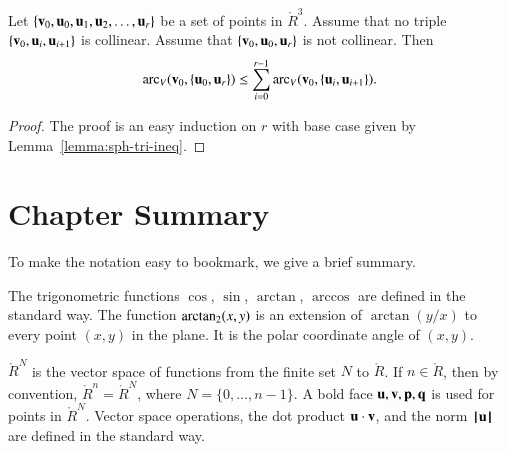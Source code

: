 \begin{lemma}[]
\label{lemma:sph-tri-multi}
Let $\{{\mathbf v}_0,{\mathbf u}_0,{\mathbf u}_1,{\mathbf u}_2,\ldots,{\mathbf u}_r\}$ be a set of points in
$\ring{R}^3$.  Assume that no triple $\{{\mathbf v}_0,{\mathbf u}_i,{\mathbf u}_{i+1}\}$ is
collinear.  Assume that $\{{\mathbf v}_0,{\mathbf u}_0,{\mathbf u}_r\}$ is not collinear.  Then
\[ 
  \operatorname{arc}_V({\mathbf v}_0,\{{\mathbf u}_0,{\mathbf u}_r\}) \le \sum_{i=0}^{r-1} \operatorname{arc}_V({\mathbf v}_0,\{{\mathbf u}_i,{\mathbf u}_{i+1}\}).
\] 
\end{lemma}

\begin{proof} The proof is an easy induction on $r$ with base case given by
  Lemma~\ref{lemma:sph-tri-ineq}.
\end{proof}


\section{Chapter Summary}


%


To make the notation easy to bookmark, 
we give a brief summary.

The trigonometric functions $\cos$, $\sin$, $\arctan$, $\arccos$ are defined in the
standard way.  The function ${\operatorname{arctan_2}}(x,y)$ is an extension of $\arctan(y/x)$ to every point $(x,y)$
in the plane.  It is the polar coordinate angle of $(x,y)$.

 $\ring{R}^N$ is the vector space of functions from the finite set $N$ to $\ring{R}$.  If
$n\in\ring{R}$,   then by convention, $\ring{R}^n = \ring{R}^N$, where $N=\{0,\ldots,n-1\}$.
A bold face ${\mathbf u},{\mathbf v},{\mathbf p},{\mathbf q}$ is used for points in $\ring{R}^N$.   Vector space operations, the
dot product ${\mathbf u}\cdot {\mathbf v}$, and the norm ${{\hskip0.1em|\hskip-0.15em|\hskip0.1em}{\mathbf u}{\hskip0.1em|\hskip-0.15em|\hskip0.1em}}$ are defined in the standard way.

